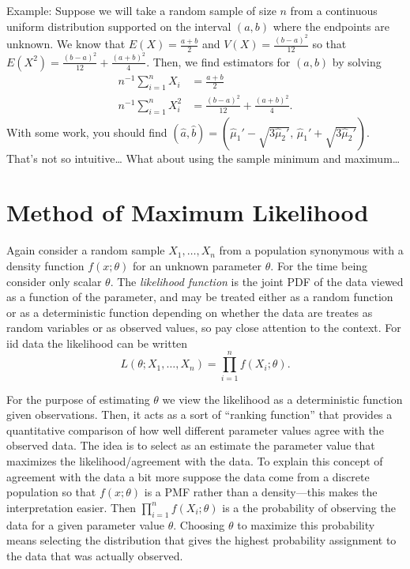 \documentclass[
]{book}
\begin{document}
Example: Suppose we will take a random sample of size \(n\) from a continuous uniform distribution supported on the interval \((a,b)\) where the endpoints are unknown. We know that \(E(X) = \frac{a+b}{2}\) and \(V(X) = \frac{(b-a)^2}{12}\) so that \(E(X^2) = \frac{(b-a)^2}{12} + \frac{(a+b)^2}{4}\). Then, we find estimators for \((a,b)\) by solving
\begin{align*}
n^{-1}\sum_{i=1}^n X_i &= \frac{a+b}{2}\\
n^{-1}\sum_{i=1}^n X_i^2 &= \frac{(b-a)^2}{12} + \frac{(a+b)^2}{4}.
\end{align*}
With some work, you should find \((\hat a, \hat b) = (\hat\mu_1' - \sqrt{3\hat\mu_2'}, \, \hat\mu_1'+\sqrt{3\hat\mu_2'})\). That's not so intuitive\ldots{} What about using the sample minimum and maximum\ldots{}

\hypertarget{method-of-maximum-likelihood}{%
\section{Method of Maximum Likelihood}\label{method-of-maximum-likelihood}}

Again consider a random sample \(X_1, \ldots, X_n\) from a population synonymous with a density function \(f(x;\theta)\) for an unknown parameter \(\theta\). For the time being consider only scalar \(\theta\). The \emph{likelihood function} is the joint PDF of the data viewed as a function of the parameter, and may be treated either as a random function or as a deterministic function depending on whether the data are treates as random variables or as observed values, so pay close attention to the context. For iid data the likelihood can be written
\[L(\theta;X_1, \ldots, X_n) = \prod_{i=1}^n f(X_i;\theta).\]

For the purpose of estimating \(\theta\) we view the likelihood as a deterministic function given observations. Then, it acts as a sort of ``ranking function'' that provides a quantitative comparison of how well different parameter values agree with the observed data. The idea is to select as an estimate the parameter value that maximizes the likelihood/agreement with the data. To explain this concept of agreement with the data a bit more suppose the data come from a discrete population so that \(f(x;\theta)\) is a PMF rather than a density---this makes the interpretation easier. Then \(\prod_{i=1}^n f(X_i;\theta)\) is a the probability of observing the data for a given parameter value \(\theta\). Choosing \(\theta\) to maximize this probability means selecting the distribution that gives the highest probability assignment to the data that was actually observed.
\end{document}
